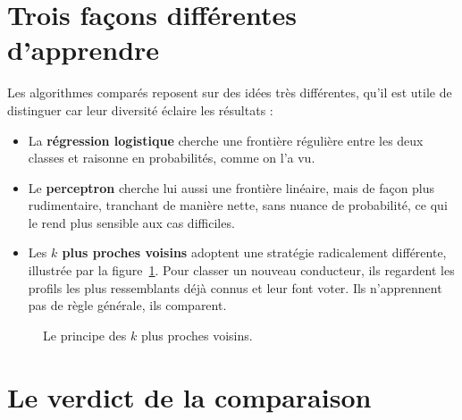 \documentclass[12pt,oneside,noprintercorrection]{iut}
\begin{document}
\section{Trois façons différentes d'apprendre}

Les algorithmes comparés reposent sur des idées très différentes, qu'il est utile de
distinguer car leur diversité éclaire les résultats :

\begin{itemize}
  \item La \textbf{régression logistique} cherche une frontière régulière entre les deux
        classes et raisonne en probabilités, comme on l'a vu.
  \item Le \textbf{perceptron} cherche lui aussi une frontière linéaire, mais de façon
        plus rudimentaire, tranchant de manière nette, sans nuance de probabilité, ce
        qui le rend plus sensible aux cas difficiles.
  \item Les \textbf{$k$ plus proches voisins} adoptent une stratégie radicalement
        différente, illustrée par la figure~\ref{fig:knn}. Pour classer un nouveau
        conducteur, ils regardent les profils les plus ressemblants déjà connus et leur
        font voter. Ils n'apprennent pas de règle générale, ils comparent.
\end{itemize}

\begin{figure}[H]
  \centering
  \caption{Le principe des $k$ plus proches voisins.}
  \label{fig:knn}
\end{figure}

\section{Le verdict de la comparaison}
\end{document}
